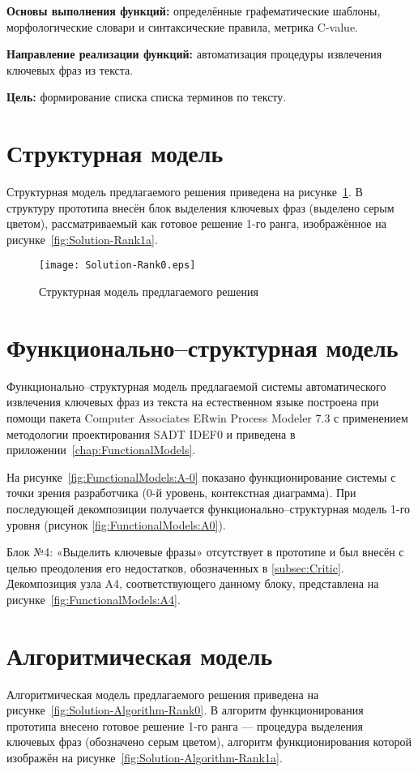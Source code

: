 \textbf{Основы выполнения функций:} определённые
графематические шаблоны, морфологические словари и
синтаксические правила, метрика C-value.

\textbf{Направление реализации функций:} автоматизация
процедуры извлечения ключевых фраз из текста.

\textbf{Цель:} формирование списка списка терминов по тексту.

\section{Структурная модель}
Структурная модель предлагаемого решения приведена на
рисунке~\ref{fig:Solution-Rank0}. В структуру прототипа внесён
блок выделения ключевых фраз (выделено серым цветом),
рассматриваемый как готовое решение 1-го ранга, изображённое
на рисунке~\ref{fig:Solution-Rank1a}.

\begin{figure}[ht]
  \centering
  \texttt{[image: Solution-Rank0.eps]}
  \caption{Структурная модель предлагаемого решения}
  \label{fig:Solution-Rank0}
\end{figure}

\section{Функционально--структурная модель}
Функционально--структурная модель предлагаемой системы автоматического
извлечения ключевых фраз из текста на естественном языке построена при
помощи пакета Computer Associates ERwin Process Modeler 7.3 с
применением методологии проектирования SADT IDEF0 и приведена в
приложении~\ref{chap:FunctionalModels}.

На рисунке~\ref{fig:FunctionalModels:A-0} показано функционирование
системы с точки зрения разработчика (0-й уровень, контекстная
диаграмма). При последующей декомпозиции получается
функционально--структурная модель 1-го уровня (рисунок
\ref{fig:FunctionalModels:A0}).

Блок №4: «Выделить ключевые фразы» отсутствует в прототипе и был
внесён с целью преодоления его недостатков, обозначенных в
\ref{subsec:Critic}. Декомпозиция узла A4, соответствующего данному
блоку, представлена на рисунке~\ref{fig:FunctionalModels:A4}.

\section{Алгоритмическая модель}
Алгоритмическая модель предлагаемого решения приведена на
рисунке~\ref{fig:Solution-Algorithm-Rank0}. В алгоритм
функционирования прототипа внесено готовое решение 1-го ранга —
процедура выделения ключевых фраз (обозначено серым цветом),
алгоритм функционирования которой изображён на
рисунке~\ref{fig:Solution-Algorithm-Rank1a}.

